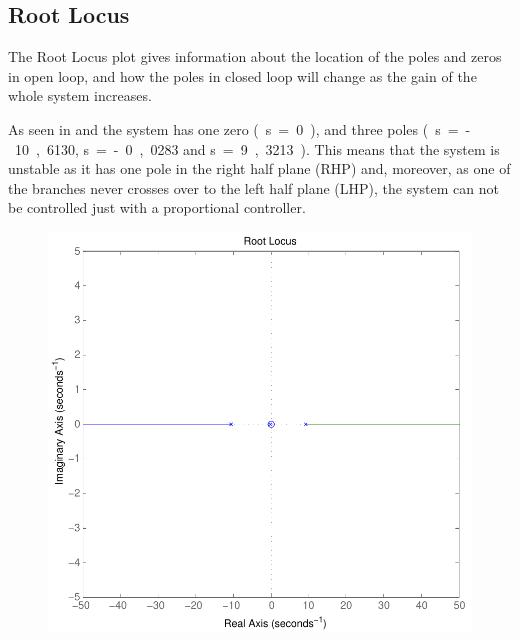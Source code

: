 \subsection{Root Locus}
The Root Locus plot gives information about the location of the poles and zeros in open loop, and how the poles in closed loop will change as the gain of the whole system increases.

As seen in  and  the system has one zero \si{(s=0)}, and three poles \si{(s=-10,6130}, \si{s=-0,0283} and \si{s=9,3213)}. This means that the system is unstable as it has one pole in the right half plane (RHP) and, moreover, as one of the branches never crosses over to the left half plane (LHP), the system can not be controlled just with a proportional controller.

\begin{minipage}{\linewidth}
 	\begin{minipage}{0.45\linewidth}
 		\begin{figure}[H]
 			\includegraphics[scale=.53]{figures/rlocusCubli}
 			\centering
 			\vspace{-.4cm}
 			\captionsetup{justification=centering}
 			\label{rlocusCubli}
 		\end{figure}\vspace{-5mm}
 	\end{minipage}

\end{minipage}
